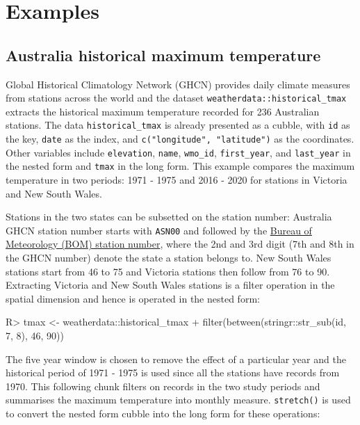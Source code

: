 \documentclass[
]{jss}
\begin{document}
\newpage

\hypertarget{examples}{%
\section{Examples}\label{examples}}

\hypertarget{australia-historical-maximum-temperature}{%
\subsection{Australia historical maximum
temperature}\label{australia-historical-maximum-temperature}}

Global Historical Climatology Network (GHCN) provides daily climate
measures from stations across the world and the dataset
\texttt{weatherdata::historical\_tmax} extracts the historical maximum
temperature recorded for 236 Australian stations. The data
\texttt{historical\_tmax} is already presented as a cubble, with
\texttt{id} as the key, \texttt{date} as the index, and
\texttt{c("longitude",\ "latitude")} as the coordinates. Other variables
include \texttt{elevation}, \texttt{name}, \texttt{wmo\_id},
\texttt{first\_year}, and \texttt{last\_year} in the nested form and
\texttt{tmax} in the long form. This example compares the maximum
temperature in two periods: 1971 - 1975 and 2016 - 2020 for stations in
Victoria and New South Wales.

Stations in the two states can be subsetted on the station number:
Australia GHCN station number starts with \texttt{ASN00} and followed by
the \href{http://www.bom.gov.au/climate/cdo/about/site-num.shtml}{Bureau
of Meteorology (BOM) station number}, where the 2nd and 3rd digit (7th
and 8th in the GHCN number) denote the state a station belongs to. New
South Wales stations start from 46 to 75 and Victoria stations then
follow from 76 to 90. Extracting Victoria and New South Wales stations
is a filter operation in the spatial dimension and hence is operated in
the nested form:

\begin{CodeChunk}
\begin{CodeInput}
R> tmax <- weatherdata::historical_tmax %
+   filter(between(stringr::str_sub(id, 7, 8), 46, 90))
\end{CodeInput}
\end{CodeChunk}

The five year window is chosen to remove the effect of a particular year
and the historical period of 1971 - 1975 is used since all the stations
have records from 1970. This following chunk filters on records in the
two study periods and summarises the maximum temperature into monthly
measure. \texttt{stretch()} is used to convert the nested form cubble
into the long form for these operations:
\end{document}

